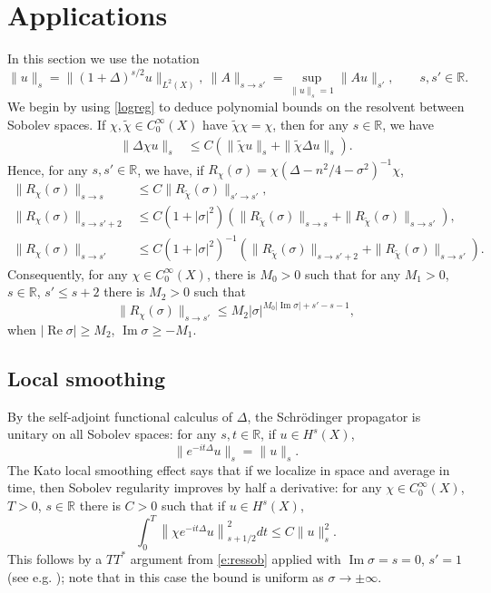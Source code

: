 \documentclass[reqno, 12pt]{amsart}
\newcommand \R {\mathbb{R}}
\DeclareMathOperator \re {Re}
\DeclareMathOperator \im {Im}
\theoremstyle{definition}
\numberwithin{equation}{section}
\numberwithin{prop}{section}
\numberwithin{figure}{section}
\begin{document}
\section{Applications}\label{s:applications}
In this section we use the notation
\[
\|u\|_s = \|(1 + \Delta)^{s/2} u\|_{L^2(X)},\ \|A\|_{s \to s'} = \sup_{\|u\|_s = 1} \|A u\|_{s'}, \qquad s,s' \in \R.
\]
We begin by using \eqref{logreg} to deduce polynomial bounds on the resolvent between Sobolev spaces. If $\chi, \widetilde \chi \in C_0^\infty(X)$ have $\widetilde \chi \chi = \chi$, then for any $s \in \R$, we have
\[\begin{split}
\|\Delta \chi u\|_s &\le C(\|\widetilde \chi u\|_s + \|\widetilde\chi \Delta u\|_s).
\end{split}\]
Hence, for any $s,s' \in \R$, we have, if $R_\chi(\sigma) = \chi (\Delta - n^2/4 - \sigma^2)^{-1} \chi$,
\[\begin{split}
\|R_\chi(\sigma)\|_{s \to s} &\le C \|R_{\widetilde \chi}(\sigma)\|_{s' \to s'},\\
\|R_\chi(\sigma)\|_{s \to s'+2} &\le C(1 + |\sigma|^2) \left(\|R_{\widetilde \chi}(\sigma)\|_{s \to s} + \|R_{\widetilde \chi}(\sigma)\|_{s \to s'}\right), \\
\|R_\chi(\sigma)\|_{s \to s'} &\le C(1 + |\sigma|^2)^{-1} \left(\|R_{\widetilde \chi}(\sigma)\|_{s \to s'+2} + \|R_{\widetilde \chi}(\sigma)\|_{s \to s'}\right). 
\end{split}\]
Consequently, for any $\chi \in C_0^\infty(X)$, there is $M_0>0$ such that for any $M_1>0$, $s\in \R$, $s' \le s+2$ there is $M_2>0$ such that
\begin{equation}\label{e:ressob}
\|R_\chi(\sigma)\|_{s \to s'} \le M_2 |\sigma|^{M_0|\im \sigma| + s' - s-1},
\end{equation}
when $|\re \sigma| \ge M_2$, $\im \sigma \ge -M_1$.

\subsection{Local smoothing}
By the self-adjoint functional calculus of $\Delta$, the Schr\"odinger propagator is unitary on all Sobolev spaces: for any $s,t \in \R$, if $u \in H^s(X)$,
\[
\|e^{-it\Delta}u\|_s = \|u\|_s.
\]
The Kato local smoothing effect says that if we localize in space and average in time, then Sobolev regularity improves by half a derivative:
for any $\chi\in C_0^\infty(X)$, $T>0$, $s \in \R$ there is $C>0$ such that if $u \in H^s(X)$,
\begin{equation}\label{e:locsmo}
\int_0^T \left\|\chi e^{-it\Delta} u\right\|^2_{s+1/2}dt \le C \|u\|^2_s.
\end{equation}
This follows by a $TT^*$ argument from \eqref{e:ressob} applied with $\im \sigma = s = 0$, $s' = 1$ (see e.g. \cite[p 424]{bur:smoothing}); note that in this case the bound is uniform as $\sigma \to \pm \infty$.
\end{document}
